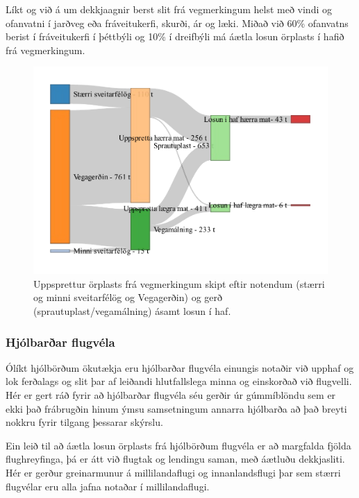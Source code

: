 \documentclass[icelandic,]{book}
\begin{document}
Líkt og við á um dekkjaagnir berst slit frá vegmerkingum helst með vindi og ofanvatni í jarðveg eða fráveitukerfi, skurði, ár og læki. Miðað við 60\% ofanvatns berist í fráveitukerfi í þéttbýli og 10\% í dreifbýli má áætla losun örplasts í hafið frá vegmerkingum.


\begin{figure}[H]
\centering
\includegraphics{_bookdown_files/OrplastHaf_files/figure-latex/vegmerkingar2-1.pdf}
\caption{\label{fig:vegmerkingar2}Uppsprettur örplasts frá vegmerkingum skipt eftir notendum (stærri og minni sveitarfélög og Vegagerðin) og gerð (sprautuplast/vegamálning) ásamt losun í haf.}
\end{figure}

\hypertarget{hjolbarar-flugvela}{%
\subsubsection*{Hjólbarðar flugvéla}\label{hjolbarar-flugvela}}

Ólíkt hjólbörðum ökutækja eru hjólbarðar flugvéla einungis notaðir við upphaf og lok ferðalags og slit þar af leiðandi hlutfallslega minna og einskorðað við flugvelli. Hér er gert ráð fyrir að hjólbarðar flugvéla séu gerðir úr gúmmíblöndu sem er ekki það frábrugðin hinum ýmsu samsetningum annarra hjólbarða að það breyti nokkru fyrir tilgang þessarar skýrslu.

Ein leið til að áætla losun örplasts frá hjólbörðum flugvéla er að margfalda fjölda flughreyfinga, þá er átt við flugtak og lendingu saman, með áætluðu dekkjasliti. Hér er gerður greinarmunur á millilandaflugi og innanlandsflugi þar sem stærri flugvélar eru alla jafna notaðar í millilandaflugi.
\end{document}
